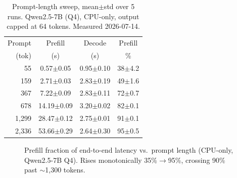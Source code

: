\documentclass[10pt,twocolumn]{article}
\begin{document}
\begin{table}[t]
  \centering
  \caption{Prompt-length sweep, mean$\pm$std over 5 runs. Qwen2.5-7B (Q4),
  CPU-only, output capped at 64 tokens. Measured 2026-07-14.}
  \label{tab:sweep}
  \begin{tabular}{rccc}
    \toprule
    Prompt & Prefill & Decode & Prefill \\
    (tok)  & (s)     & (s)    & \% \\
    \midrule
    55      & 0.57$\pm$0.05  & 0.95$\pm$0.10 & 38$\pm$4.2 \\
    159     & 2.71$\pm$0.03  & 2.83$\pm$0.19 & 49$\pm$1.6 \\
    367     & 7.22$\pm$0.09  & 2.83$\pm$0.11 & 72$\pm$0.7 \\
    678     & 14.19$\pm$0.09 & 3.20$\pm$0.02 & 82$\pm$0.1 \\
    1{,}299 & 28.47$\pm$0.12 & 2.75$\pm$0.01 & 91$\pm$0.1 \\
    2{,}336 & 53.66$\pm$0.29 & 2.64$\pm$0.30 & 95$\pm$0.5 \\
    \bottomrule
  \end{tabular}
\end{table}

\begin{figure}[t]
  \centering
  \caption{Prefill fraction of end-to-end latency vs.\ prompt length
  (CPU-only, Qwen2.5-7B Q4). Rises monotonically 35\%$\rightarrow$95\%,
  crossing 90\% past $\sim$1{,}300 tokens.}
  \label{fig:promptlen}
\end{figure}
\end{document}
